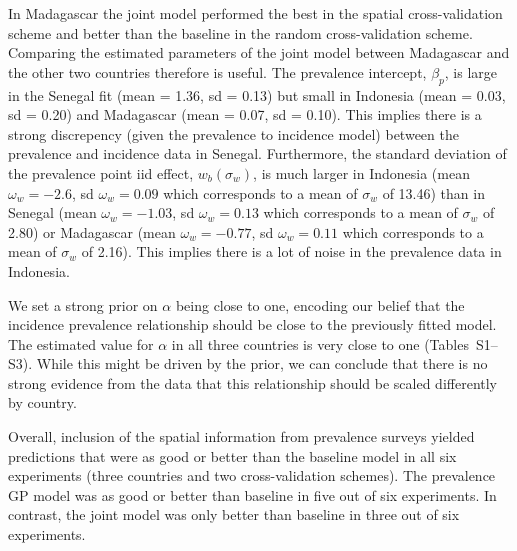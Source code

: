 \documentclass{statsoc}
\begin{document}
In Madagascar the joint model performed the best in the spatial cross-validation scheme and better than the baseline in the random cross-validation scheme. 
Comparing the estimated parameters of the joint model between Madagascar and the other two countries therefore is useful.
The prevalence intercept, $\beta_p$, is large in the Senegal fit (mean = 1.36, sd = 0.13) but small in Indonesia (mean = 0.03, sd = 0.20) and Madagascar (mean = 0.07, sd = 0.10).
This implies there is a strong discrepency (given the prevalence to incidence model) between the prevalence and incidence data in Senegal.
Furthermore, the standard deviation of the prevalence point iid effect, $w_b(\sigma_w)$, is much larger in Indonesia (mean $\omega_w = -2.6$, sd $\omega_w = 0.09$ which corresponds to a mean of $\sigma_w$ of 13.46) than in Senegal (mean $\omega_w = -1.03$, sd $\omega_w = 0.13$ which corresponds to a mean of $\sigma_w$ of 2.80) or Madagascar (mean $\omega_w = -0.77$, sd $\omega_w = 0.11$ which corresponds to a mean of $\sigma_w$ of 2.16).
This implies there is a lot of noise in the prevalence data in Indonesia.

We set a strong prior on $\alpha$ being close to one, encoding our belief that the incidence prevalence relationship should be close to the previously fitted model.
The estimated value for $\alpha$ in all three countries is very close to one (Tables~S1--S3).
While this might be driven by the prior, we can conclude that there is no strong evidence from the data that this relationship should be scaled differently by country.


Overall, inclusion of the spatial information from prevalence surveys yielded predictions that were as good or better than the baseline model in all six experiments (three countries and two cross-validation schemes).
The prevalence GP model was as good or better than baseline in five out of six experiments.
In contrast, the joint model was only better than baseline in three out of six experiments.



\end{document}
